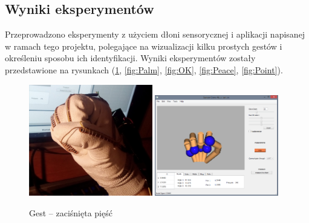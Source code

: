 \documentclass[10pt,a4paper]{article}
\begin{document}
\newpage
\subsection{Wyniki eksperymentów}
Przeprowadzono eksperymenty z użyciem dłoni sensorycznej i aplikacji napisanej w ramach tego projektu, polegające na wizualizacji kilku prostych gestów i określeniu sposobu ich identyfikacji. Wyniki eksperymentów zostały przedstawione na rysunkach (\ref{fig:Fist}, \ref{fig:Palm}, \ref{fig:OK}, \ref{fig:Peace}, \ref{fig:Point}).\\
\begin{figure}[!htb]
\centering
    \subfloat
    {
      \includegraphics[width=0.48\textwidth]{./Fist.jpg}
    }
    \subfloat
    {
      \includegraphics[width=0.48\textwidth]{./FistQt.png}
    }
    \caption{Gest -- zaciśnięta pięść \label{fig:Fist}}
\end{figure}
\end{document}
